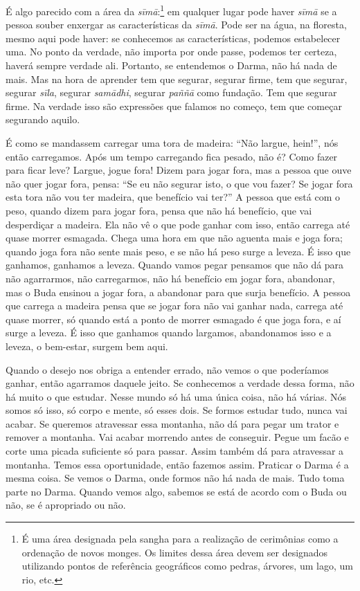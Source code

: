 É algo parecido com a área da \emph{sīmā}:\footnote{É uma área
designada pela sangha para a realização de cerimônias como a ordenação
de novos monges. Os limites dessa área devem ser designados utilizando
pontos de referência geográficos como pedras, árvores, um lago, um rio,
etc.} em qualquer lugar pode haver \emph{sīmā} se a pessoa
souber enxergar as características da \emph{sīmā}. Pode ser na
água, na floresta, mesmo aqui pode haver: se conhecemos as
características, podemos estabelecer uma. No ponto da verdade, não
importa por onde passe, podemos ter certeza, haverá sempre verdade ali.
Portanto, se entendemos o Darma, não há nada de mais. Mas na hora de
aprender tem que segurar, segurar firme, tem que segurar, segurar
\emph{sīla}, segurar \emph{samādhi}, segurar \emph{paññā}
como fundação. Tem que segurar firme. Na verdade isso são expressões
que falamos no começo, tem que começar segurando aquilo. 

É como se mandassem carregar uma tora de madeira: “Não largue,
hein!”, nós então carregamos. Após um tempo carregando fica pesado, não
é? Como fazer para ficar leve? Largue, jogue fora! Dizem para jogar
fora, mas a pessoa que ouve não quer jogar fora, pensa: “Se eu não
segurar isto, o que vou fazer? Se jogar fora esta tora não vou ter
madeira, que benefício vai ter?” A pessoa que está com o peso, quando
dizem para jogar fora, pensa que não há benefício, que vai desperdiçar
a madeira. Ela não vê o que pode ganhar com isso, então carrega até
quase morrer esmagada. Chega uma hora em que não aguenta mais e joga
fora; quando joga fora não sente mais peso, e se não há peso surge a
leveza. É isso que ganhamos, ganhamos a leveza. Quando vamos pegar
pensamos que não dá para não agarrarmos, não carregarmos, não há
benefício em jogar fora, abandonar, mas o Buda ensinou a jogar fora, a
abandonar para que surja benefício. A pessoa que carrega a madeira
pensa que se jogar fora não vai ganhar nada, carrega até quase morrer,
só quando está a ponto de morrer esmagado é que joga fora, e aí surge a
leveza. É isso que ganhamos quando largamos, abandonamos isso e a
leveza, o bem-estar, surgem bem aqui. 

Quando o desejo nos obriga a entender errado, não vemos o que
poderíamos ganhar, então agarramos daquele jeito. Se conhecemos a
verdade dessa forma, não há muito o que estudar. Nesse mundo só há uma
única coisa, não há várias. Nós somos só isso, só corpo e mente, só
esses dois. Se formos estudar tudo, nunca vai acabar. Se queremos
atravessar essa montanha, não dá para pegar um trator e remover a
montanha. Vai acabar morrendo antes de conseguir. Pegue um facão e
corte uma picada suficiente só para passar. Assim também dá para
atravessar a montanha. Temos essa oportunidade, então fazemos assim.
Praticar o Darma é a mesma coisa. Se vemos o Darma, onde formos não há
nada de mais. Tudo toma parte no Darma. Quando vemos algo, sabemos se
está de acordo com o Buda ou não, se é apropriado ou não. 

